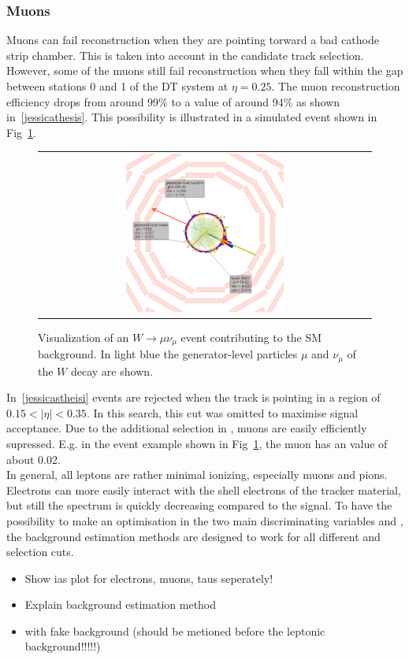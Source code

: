 \subsubsection*{Muons}
Muons can fail reconstruction when they are pointing torward a bad cathode strip chamber.
This is taken into account in the candidate track selection.
However, some of the muons still fail reconstruction when they fall within the gap between stations 0 and 1 of the DT system at $\eta=0.25$.
The muon reconstruction efficiency drops from around 99\% to a value of around 94\% as shown in~\ref{jessicathesis}. 
This possibility is illustrated in a simulated event shown in Fig~\ref{fig:LostMuon}.
\begin{figure}[!tb]
  \centering 
  \begin{tabular}{c}
    \includegraphics[width=0.49\textwidth]{figures/analysis/LostMuon_Lumi_357583_Event_142918834.png}
  \end{tabular}
  \caption{Visualization of an $W\rightarrow \mu\nu_{\mu}$ event contributing to the SM background. 
           In light blue the generator-level particles $\mu$ and $\nu_{\mu}$ of the $W$ decay are shown. }
  \label{fig:LostMuon}
\end{figure}
In~\ref{jessicastheisi} events are rejected when the track is pointing in a region of $0.15<|\eta|<0.35$.
In this search, this cut was omitted to maximise signal acceptance. 
Due to the additional selection in \ias, muons are easily efficiently supressed.
E.g. in the event example shown in Fig~\ref{fig:LostMuon}, the muon has an \ias value of about 0.02.\\


In general, all leptons are rather minimal ionizing, especially muons and pions.
Electrons can more easily interact with the shell electrons of the tracker material, but still the \ias spectrum is quickly decreasing compared to the signal.
To have the possibility to make an optimisation in the two main discriminating variables \pt and \ias, the background estimation methods are designed to work for all different \pt and \ias selection cuts.
\begin{itemize}
\item Show ias plot for electrons, muons, taus seperately!
\item Explain background estimation method
\item with fake background (should be metioned before the leptonic background!!!!!)
\end{itemize} 



